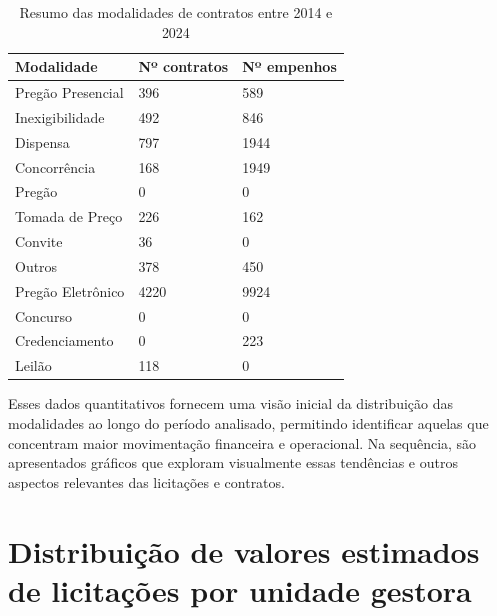 \documentclass[
	12pt,				%
	oneside,			%
	a4paper,			%
	chapter=TITLE,		%
	section=TITLE,		%
	english,			%
	brazil				%
	]{abntex2}
\begin{document}
\begin{table}[h]
	\caption{Resumo das modalidades de contratos entre 2014 e 2024}
	\label{tab:modalidades-contratos}
	\center
	\begin{tabular}{|l|l|l|}
		\hline
		\textbf{Modalidade} & \textbf{Nº contratos} & \textbf{Nº empenhos} \\ \hline
		Pregão Presencial & 396 & 589 \\ \hline
		Inexigibilidade & 492 & 846 \\ \hline
		Dispensa & 797 & 1944 \\ \hline
		Concorrência & 168 & 1949 \\ \hline
		Pregão & 0 & 0 \\ \hline
		Tomada de Preço & 226 & 162 \\ \hline
		Convite & 36 & 0 \\ \hline
		Outros & 378 & 450 \\ \hline
		Pregão Eletrônico & 4220 & 9924 \\ \hline
		Concurso & 0 & 0 \\ \hline
		Credenciamento & 0 & 223 \\ \hline
		Leilão & 118 & 0 \\ \hline
	\end{tabular}
\end{table}

Esses dados quantitativos fornecem uma visão inicial da distribuição das modalidades ao longo do período analisado, permitindo identificar aquelas que concentram maior movimentação financeira e operacional. Na sequência, são apresentados gráficos que exploram visualmente essas tendências e outros aspectos relevantes das licitações e contratos.

\section*{Distribuição de valores estimados de licitações por unidade gestora}
\end{document}
